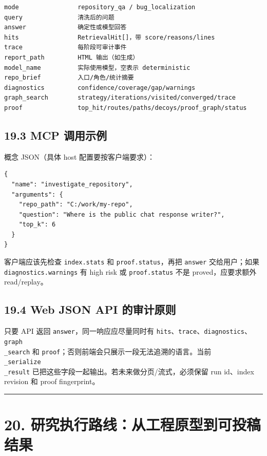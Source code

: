 \documentclass[UTF8,12pt,openany]{ctexbook}
\begin{document}
\begin{lstlisting}
mode                repository_qa / bug_localization
query               清洗后的问题
answer              确定性或模型回答
hits                RetrievalHit[]，带 score/reasons/lines
trace               每阶段可审计事件
report_path         HTML 输出（如生成）
model_name          实际使用模型，空表示 deterministic
repo_brief          入口/角色/统计摘要
diagnostics         confidence/coverage/gap/warnings
graph_search        strategy/iterations/visited/converged/trace
proof               top_hit/routes/paths/decoys/proof_graph/status
\end{lstlisting}

\subsection{19.3 MCP 调用示例}

概念 JSON（具体 host 配置要按客户端要求）：\par

\begin{lstlisting}
{
  "name": "investigate_repository",
  "arguments": {
    "repo_path": "C:/work/my-repo",
    "question": "Where is the public chat response writer?",
    "top_k": 6
  }
}
\end{lstlisting}

客户端应该先检查 \texttt{index.stats} 和 \texttt{proof.status}，再把 \texttt{answer} 交给用户；如果 \texttt{diagnostics.warnings} 有 high risk 或 \texttt{proof.status} 不是 proved，应要求额外 read/replay。\par

\subsection{19.4 Web JSON API 的审计原则}

只要 API 返回 \texttt{answer}，同一响应应尽量同时有 \texttt{hits}、\texttt{trace}、\texttt{diagnostics}、\texttt{graph\\_search} 和 \texttt{proof}；否则前端会只展示一段无法追溯的语言。当前 \texttt{\\_serialize\\_result} 已把这些字段一起输出。若未来做分页/流式，必须保留 run id、index revision 和 proof fingerprint。\par

\hrule

\section{20. 研究执行路线：从工程原型到可投稿结果}
\end{document}
